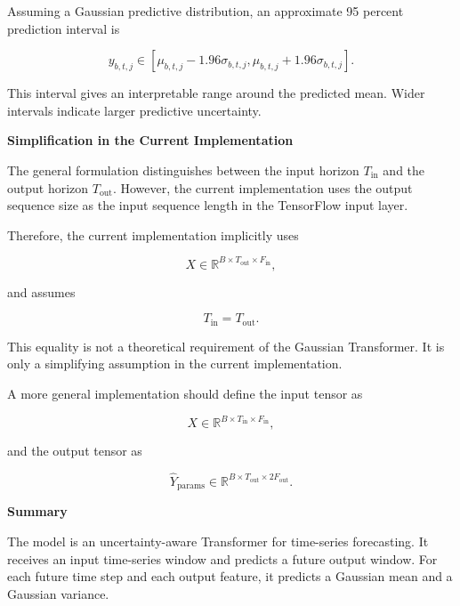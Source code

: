\documentclass{book}
\providecommand{\ProjectDeepHeading}[2]{%
    \par\medskip\noindent\textbf{#2}\par\smallskip
}
\begin{document}
        Assuming a Gaussian predictive distribution, an approximate 95 percent prediction interval is
        
        \[
            y_{b,t,j}
            \in
            \left[
                \ensuremath{\mu}_{b,t,j}
                -
                1.96\ensuremath{\sigma}_{b,t,j},
                \ensuremath{\mu}_{b,t,j}
                +
                1.96\ensuremath{\sigma}_{b,t,j}
            \right].
        \]
        
        This interval gives an interpretable range around the predicted mean. Wider intervals indicate larger predictive uncertainty.
    
    
    \ProjectDeepHeading{8}{Simplification in the Current Implementation}
        
        The general formulation distinguishes between the input horizon \(T_{\mathrm{in}}\) and the output horizon \(T_{\mathrm{out}}\). However, the current implementation uses the output sequence size as the input sequence length in the TensorFlow input layer.
        
        Therefore, the current implementation implicitly uses
        
        \[
            X
            \in
            \mathbb{R}^{B \times T_{\mathrm{out}} \times F_{\mathrm{in}}},
        \]
        
        and assumes
        
        \[
            T_{\mathrm{in}}
            =
            T_{\mathrm{out}}.
        \]
        
        This equality is not a theoretical requirement of the Gaussian Transformer. It is only a simplifying assumption in the current implementation.
        
        A more general implementation should define the input tensor as
        
        \[
            X
            \in
            \mathbb{R}^{B \times T_{\mathrm{in}} \times F_{\mathrm{in}}},
        \]
        
        and the output tensor as
        
        \[
            \hat{Y}_{\mathrm{params}}
            \in
            \mathbb{R}^{B \times T_{\mathrm{out}} \times 2F_{\mathrm{out}}}.
        \]
    
    
    \ProjectDeepHeading{8}{Summary}
        
        The model is an uncertainty-aware Transformer for time-series forecasting. It receives an input time-series window and predicts a future output window. For each future time step and each output feature, it predicts a Gaussian mean and a Gaussian variance.
        
\end{document}
